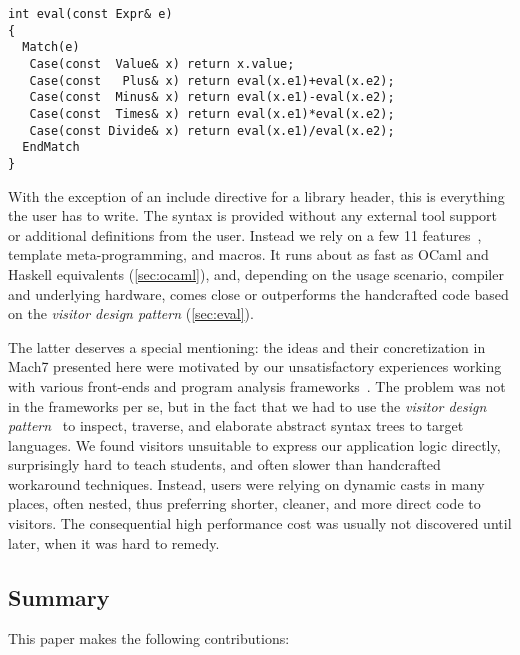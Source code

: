 
\begin{lstlisting}[columns=flexible]
int eval(const Expr& e)
{
  Match(e)
   Case(const  Value& x) return x.value;
   Case(const   Plus& x) return eval(x.e1)+eval(x.e2);
   Case(const  Minus& x) return eval(x.e1)-eval(x.e2);
   Case(const  Times& x) return eval(x.e1)*eval(x.e2);
   Case(const Divide& x) return eval(x.e1)/eval(x.e2);
  EndMatch
}
\end{lstlisting}

\noindent
With the exception of an include directive for a library header, this is everything the user has to write.
The syntax is provided without any external tool support or additional definitions from the user. Instead we rely on a 
few \Cpp{}11 features~\cite{C++11}, template meta-programming, and macros. It runs 
about as fast as OCaml and Haskell equivalents (\textsection\ref{sec:ocaml}), and, depending 
on the usage scenario, compiler and underlying hardware, comes close or 
outperforms the handcrafted \Cpp{} code based on the \emph{visitor design pattern} 
(\textsection\ref{sec:eval}).

The latter deserves a special mentioning: the ideas and their concretization in 
Mach7 presented here were motivated by our unsatisfactory experiences working 
with various \Cpp{} front-ends and program analysis frameworks~\cite{Pivot09,Phoenix,Clang}. 
The problem was not in the frameworks per se, but in the fact that we had to use
the \emph{visitor design pattern}~\cite{DesignPatterns1993} to inspect, traverse, and 
elaborate abstract syntax trees to target languages. We found visitors 
unsuitable to express our application logic directly, surprisingly hard to teach 
students, and often slower than handcrafted workaround techniques. Instead, 
users were relying on dynamic casts in many places, often nested, thus preferring 
shorter, cleaner, and more direct code to visitors. The consequential high 
performance cost was usually not discovered until later, when it was hard to 
remedy.

\subsection{Summary}

This paper makes the following contributions:

